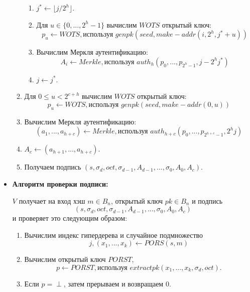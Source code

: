 \documentclass[a4paper, 14pt]{extarticle}
\begin{document}
\begin{itemize}
\begin{enumerate}
\begin{enumerate}
            \item $j^{*} \leftarrow \lfloor j / 2^{h} \rfloor$.

            \item Для $u \in \{0, ..., 2^{h} - 1\}$ вычислим $WOTS$ открытый ключ:
            \[p_{u} \leftarrow WOTS, \text{используя } genpk(seed, make-addr(i, 2^{h}, j^{*} + u))\]

            \item Вычислим Меркля аутентификацию:
            \[A_{i} \leftarrow Merkle, \text{используя } auth_{h}(p_{0}, ..., p_{2^{h} - 1}, j - 2^{h}j^{*})\]

            \item $j \leftarrow j^{*}$.
        \end{enumerate}

        \item Для $0 \leq u < 2^{c+h}$ вычислим $WOTS$ открытый ключ:
        \[p_{u} \leftarrow WOTS, \text{используя } genpk(seed, make-addr(0, u))\]

        \item Вычислим Меркля аутентификацию:
        \[(a_{1}, ..., a_{h+c}) \leftarrow Merkle, \text{используя } auth_{h+c}(p_{0}, ..., p_{2^{h+c} - 1}, 2^{h}j)\]

        \item $A_{c} \leftarrow (a_{h+1}, ..., a_{h+c})$.

        \item Получаем подпись $(s, \sigma_{d}, oct, \sigma_{d - 1}, A_{d - 1}, ..., \sigma_{0}, A_{0}, A_{c})$.
    \end{enumerate}

    \item \textbf{Алгоритм проверки подписи:}

    $V$ получает на вход хэш $m \in B_{n}$, открытый ключ $pk \in B_{n}$ и подпись
    \[(s, \sigma_{d}, oct, \sigma_{d - 1}, A_{d - 1}, ..., \sigma_{0}, A_{0}, A_{c})\]
    и проверяет это следующим образом:

    \begin{enumerate}
        \item Вычислим индекс гипердерева и случайное подмножество
        \[j, (x_{1}, ..., x_{k}) \leftarrow PORS(s,m)\]

        \item Вычислим открытый ключ $PORST$,
        \[p \leftarrow PORST, \text{используя } extractpk(x_{1}, ..., x_{k}, \sigma_{d}, oct).\]

        \item Если $p = \perp$, затем прерываем и возвращаем 0.


\end{enumerate}
\end{itemize}
\end{document}
